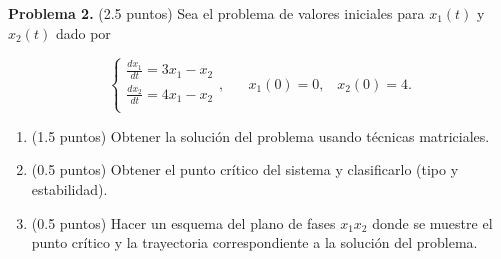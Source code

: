 \textbf{Problema 2.} (2.5 puntos) Sea el problema de valores iniciales para $x_1(t)$ y $x_2(t)$ dado por

\begin{equation*}
    \begin{cases}

        \frac{dx_1}{dt} = 3x_1- x_2\\[10pt]
        \frac{dx_2}{dt} = 4x_1- x_2\\

    \end{cases}
    , \hspace{20pt} x_1(0) = 0, \hspace{10pt} x_2(0) = 4.

\end{equation*}

\begin{enumerate}
[label=(\alph*)]
    \item (1.5 puntos) Obtener la solución del problema usando técnicas matriciales.
    \item (0.5 puntos) Obtener el punto crítico del sistema y clasificarlo (tipo y estabilidad).
    \item (0.5 puntos) Hacer un esquema del plano de fases $x_1 x_2$ donde se muestre el punto crítico y
    la trayectoria correspondiente a la solución del problema.
\end{enumerate}

